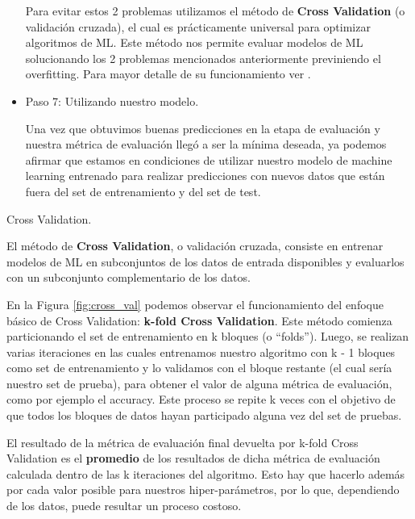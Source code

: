 \documentclass[12pt,a4paper]{article}
\makeatletter
\renewcommand\paragraph{\@startsection{paragraph}{4}{\z@}
            {-2.5ex\@plus -1ex \@minus -.25ex}
            {1.25ex \@plus .25ex}
            {\normalfont\normalsize\bfseries}}
\makeatother
\begin{document}
\begin{sloppypar}
\begin{itemize}
Para evitar estos 2 problemas utilizamos el método de \textbf{Cross Validation} (o validación cruzada), el cual es prácticamente universal para optimizar algoritmos de ML. Este método nos permite evaluar modelos de ML solucionando los 2 problemas mencionados anteriormente previniendo el overfitting. Para mayor detalle de su funcionamiento ver \textit{}.\\

\item Paso 7: Utilizando nuestro modelo. 

Una vez que obtuvimos buenas predicciones en la etapa de evaluación y nuestra métrica de evaluación llegó a ser la mínima deseada, ya podemos afirmar que estamos en condiciones de utilizar nuestro modelo de machine learning entrenado para realizar predicciones con nuevos datos que están fuera del set de entrenamiento y del set de test.

\end{itemize}

\cleardoublepage

\paragraph{Cross Validation.}\label{Cross Validation}

El método de \textbf{Cross Validation}, o validación cruzada\cite{apunte_uba}\cite{cross_validation}, consiste en entrenar modelos de ML en subconjuntos de los datos de entrada disponibles y evaluarlos con un subconjunto complementario de los datos.

En la Figura \ref{fig:cross_val} podemos observar el funcionamiento del enfoque básico de Cross Validation: \textbf{k-fold Cross Validation}. Este método comienza particionando el set de entrenamiento en k bloques (o ``folds''). Luego, se realizan varias iteraciones en las cuales entrenamos nuestro algoritmo con k - 1 bloques como set de entrenamiento y lo validamos con el bloque restante (el cual sería nuestro set de prueba), para obtener el valor de alguna métrica de evaluación, como por ejemplo el accuracy. Este proceso se repite k veces con el objetivo de que todos los bloques de datos hayan participado alguna vez del set de pruebas. 

El resultado de la métrica de evaluación final devuelta por k-fold Cross Validation es el \textbf{promedio} de los resultados de dicha métrica de evaluación calculada dentro de las k iteraciones del algoritmo. Esto hay que hacerlo además por cada valor posible para nuestros hiper-parámetros, por lo que, dependiendo de los datos, puede resultar un proceso costoso.


\end{sloppypar}
\end{document}
